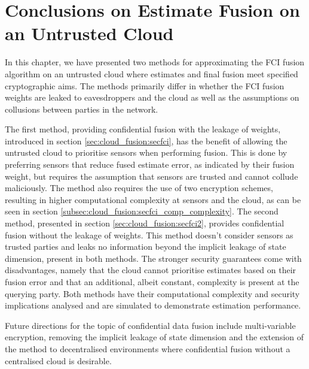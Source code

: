 % 
%                                               
%                                               
%                                               
% 

\section{Conclusions on Estimate Fusion on an Untrusted Cloud}\label{sec:cloud_fusion:conclusion}
In this chapter, we have presented two methods for approximating the FCI fusion algorithm on an untrusted cloud where estimates and final fusion meet specified cryptographic aims. The methods primarily differ in whether the FCI fusion weights are leaked to eavesdroppers and the cloud as well as the assumptions on collusions between parties in the network.

The first method, providing confidential fusion with the leakage of weights, introduced in section \ref{sec:cloud_fusion:secfci}, has the benefit of allowing the untrusted cloud to prioritise sensors when performing fusion. This is done by preferring sensors that reduce fused estimate error, as indicated by their fusion weight, but requires the assumption that sensors are trusted and cannot collude maliciously. The method also requires the use of two encryption schemes, resulting in higher computational complexity at sensors and the cloud, as can be seen in section \ref{subsec:cloud_fusion:secfci_comp_complexity}. The second method, presented in section \ref{sec:cloud_fusion:secfci2}, provides confidential fusion without the leakage of weights. This method doesn't consider sensors as trusted parties and leaks no information beyond the implicit leakage of state dimension, present in both methods. The stronger security guarantees come with disadvantages, namely that the cloud cannot prioritise estimates based on their fusion error and that an additional, albeit constant, complexity is present at the querying party. Both methods have their computational complexity and security implications analysed and are simulated to demonstrate estimation performance.

Future directions for the topic of confidential data fusion include multi-variable encryption, removing the implicit leakage of state dimension and the extension of the method to decentralised environments where confidential fusion without a centralised cloud is desirable.
